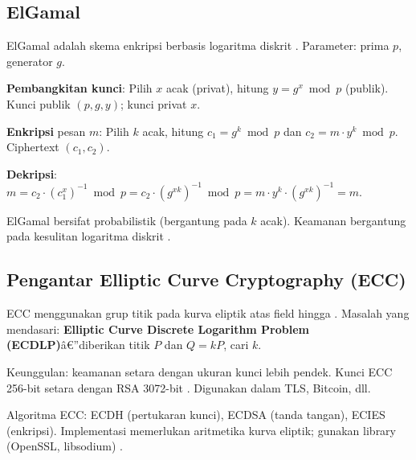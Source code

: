 \subsection{ElGamal}

ElGamal adalah skema enkripsi berbasis logaritma diskrit \cite{stallings2017}. Parameter: prima $p$, generator $g$.

\textbf{Pembangkitan kunci}: Pilih $x$ acak (privat), hitung $y = g^x \bmod p$ (publik). Kunci publik $(p, g, y)$; kunci privat $x$.

\textbf{Enkripsi} pesan $m$: Pilih $k$ acak, hitung $c_1 = g^k \bmod p$ dan $c_2 = m \cdot y^k \bmod p$. Ciphertext $(c_1, c_2)$.

\textbf{Dekripsi}: $m = c_2 \cdot (c_1^x)^{-1} \bmod p = c_2 \cdot (g^{xk})^{-1} \bmod p = m \cdot y^k \cdot (g^{xk})^{-1} = m$.

ElGamal bersifat probabilistik (bergantung pada $k$ acak). Keamanan bergantung pada kesulitan logaritma diskrit \cite{menezes1996}.

\subsection{Pengantar Elliptic Curve Cryptography (ECC)}

ECC menggunakan grup titik pada kurva eliptik atas field hingga \cite{stallings2017}. Masalah yang mendasari: \textbf{Elliptic Curve Discrete Logarithm Problem (ECDLP)}â€”diberikan titik $P$ dan $Q = kP$, cari $k$.

Keunggulan: keamanan setara dengan ukuran kunci lebih pendek. Kunci ECC 256-bit setara dengan RSA 3072-bit \cite{nist800_56b_r2}. Digunakan dalam TLS, Bitcoin, dll.

Algoritma ECC: ECDH (pertukaran kunci), ECDSA (tanda tangan), ECIES (enkripsi). Implementasi memerlukan aritmetika kurva eliptik; gunakan library (OpenSSL, libsodium) \cite{menezes1996}.


